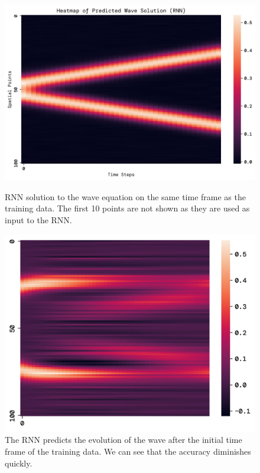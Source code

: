 \documentclass[twoside,11pt]{report}
\begin{document}
    \begin{figure}[!ht]
        \begin{minipage}[t]{0.5\textwidth - 1mm}
            \begin{center}
                \includegraphics[width=\textwidth]{../runsAndFigures/wave_rnn.png}
            \end{center}
            \caption
            {
                RNN solution to the wave equation on the same time frame as the training data. 
                The first 10 points are not shown as they are used as input to the RNN.
            }\label{fig:wave_own_dnn}
        \end{minipage}
        \hspace{2mm}
        \begin{minipage}[t]{0.5\textwidth - 1mm}
            \begin{center}
                \includegraphics[width=\textwidth]{../runsAndFigures/wave_rnn_future.png}
            \end{center}
            \caption
            {
                The RNN predicts the evolution of the wave after the initial time frame of the training data.
                We can see that the accuracy diminishes quickly.
            }\label{fig:wave_tf_dnn}
        \end{minipage}
    \end{figure}
\end{document}
